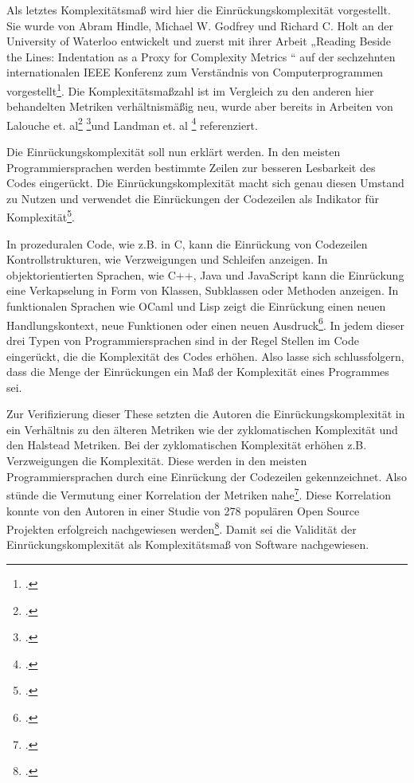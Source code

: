 Als letztes Komplexitätsmaß wird hier die Einrückungskomplexität
vorgestellt. Sie wurde von Abram Hindle, Michael W. Godfrey und Richard
C. Holt an der University of Waterloo entwickelt und zuerst mit ihrer
Arbeit „Reading Beside the Lines: Indentation as a Proxy for Complexity
Metrics `` auf der sechzehnten internationalen IEEE Konferenz zum
Verständnis von Computerprogrammen vorgestellt\footcite[Vgl. ][]{hindleReadingLinesIndentation2008
  S. 1}. Die Komplexitätsmaßzahl ist im Vergleich zu den anderen hier
behandelten Metriken verhältnismäßig neu, wurde aber bereits in Arbeiten
von Lalouche et. al\footcite[Vgl. ][]{gilWhenSoftwareComplexity2016 S. 10}
\footcite[Vgl. ][]{gilCorrelationSizeMetric2017 S. 7}und Landman et. al
\footcite[Vgl. ][]{landmanEmpiricalAnalysisRelationship2016 S. 6} referenziert.

Die Einrückungskomplexität soll nun erklärt werden. In den meisten
Programmiersprachen werden bestimmte Zeilen zur besseren Lesbarkeit des
Codes eingerückt. Die Einrückungskomplexität macht sich genau diesen
Umstand zu Nutzen und verwendet die Einrückungen der Codezeilen als
Indikator für Komplexität\footcite[Vgl. ][]{hindleReadingLinesUsing2009 S. 1}.

In prozeduralen Code, wie z.B. in C, kann die Einrückung von Codezeilen
Kontrollstrukturen, wie Verzweigungen und Schleifen anzeigen. In
objektorientierten Sprachen, wie C++, Java und JavaScript kann die
Einrückung eine Verkapselung in Form von Klassen, Subklassen oder
Methoden anzeigen. In funktionalen Sprachen wie OCaml und Lisp zeigt die
Einrückung einen neuen Handlungskontext, neue Funktionen oder einen
neuen Ausdruck\footcite[Vgl. ][]{}. In jedem dieser drei Typen von
Programmiersprachen sind in der Regel Stellen im Code eingerückt, die
die Komplexität des Codes erhöhen. Also lasse sich schlussfolgern, dass
die Menge der Einrückungen ein Maß der Komplexität eines Programmes sei.

Zur Verifizierung dieser These setzten die Autoren die
Einrückungskomplexität in ein Verhältnis zu den älteren Metriken wie der
zyklomatischen Komplexität und den Halstead Metriken. Bei der
zyklomatischen Komplexität erhöhen z.B. Verzweigungen die Komplexität.
Diese werden in den meisten Programmiersprachen durch eine Einrückung
der Codezeilen gekennzeichnet. Also stünde die Vermutung einer
Korrelation der Metriken nahe\footcite[Vgl. ][]{hindleReadingLinesUsing2009 S. 2}.
Diese Korrelation konnte von den Autoren in einer Studie von 278
populären Open Source Projekten erfolgreich nachgewiesen
werden\footcite[Vgl. ][]{Quelle}. Damit sei die Validität der
Einrückungskomplexität als Komplexitätsmaß von Software nachgewiesen.

